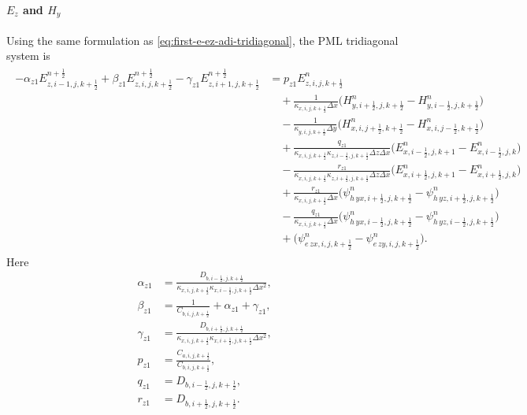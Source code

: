 \documentclass{article}
\numberwithin{equation}{section}
\numberwithin{figure}{section}
\begin{document}
\paragraph{$E_z$ and $H_y$}
Using the same formulation as \eqref{eq:first-e-ez-adi-tridiagonal}, the PML tridiagonal system is
\begin{align}
    \begin{split}
        -\alpha_{z1}E_{z,i-1,j,k+\tfrac12}^{n+\frac12} + \beta_{z1}E_{z,i,j,k+\tfrac12}^{n+\frac12} - \gamma_{z1}E_{z,i+1,j,k+\tfrac12}^{n+\frac12}
         & = p_{z1}E_{z,i,j,k+\tfrac12}^{n}                                                                                                                               \\
         & \quad +\frac{1}{\kappa_{x,i,j,k+\tfrac12}\Delta x}\Big(H_{y,i+\tfrac12,j,k+\tfrac12}^{n}-H_{y,i-\tfrac12,j,k+\tfrac12}^{n}\Big)                                \\
         & \quad -\frac{1}{\kappa_{y,i,j,k+\tfrac12}\Delta y}\Big(H_{x,i,j+\tfrac12,k+\tfrac12}^{n}-H_{x,i,j-\tfrac12,k+\tfrac12}^{n}\Big)                                \\
         & \quad +\frac{q_{z1}}{\kappa_{x,i,j,k+\tfrac12}\kappa_{z,i-\tfrac12,j,k+\tfrac12}\Delta z\Delta x}\Big(E_{x,i-\tfrac12,j,k+1}^{n}-E_{x,i-\tfrac12,j,k}^{n}\Big) \\
         & \quad -\frac{r_{z1}}{\kappa_{x,i,j,k+\tfrac12}\kappa_{z,i+\tfrac12,j,k+\tfrac12}\Delta z\Delta x}\Big(E_{x,i+\tfrac12,j,k+1}^{n}-E_{x,i+\tfrac12,j,k}^{n}\Big) \\
         & \quad +\frac{r_{z1}}{\kappa_{x,i,j,k+\tfrac12}\Delta x}\Big(\psi^{n}_{h\,yx,i+\tfrac12,j,k+\tfrac12} - \psi^{n}_{h\,yz,i+\tfrac12,j,k+\tfrac12}\Big)           \\
         & \quad -\frac{q_{z1}}{\kappa_{x,i,j,k+\tfrac12}\Delta x}\Big(\psi^{n}_{h\,yx,i-\tfrac12,j,k+\tfrac12} - \psi^{n}_{h\,yz,i-\tfrac12,j,k+\tfrac12}\Big)           \\
         & \quad +\Big(\psi^{n}_{e\,zx,i,j,k+\tfrac12}-\psi^{n}_{e\,zy,i,j,k+\tfrac12}\Big).
    \end{split}
    \label{eq:first-e-ez-pml-adi-tridiagonal}
\end{align}
Here
\begin{align}
    \alpha_{z1} & =\frac{D_{b,i-\tfrac12,j,k+\tfrac12}}{\kappa_{x,i,j,k+\tfrac12}\kappa_{x,i-\tfrac12,j,k+\tfrac12}\Delta x^2}, \\
    \beta_{z1}  & =\frac{1}{C_{b,i,j,k+\tfrac12}}+\alpha_{z1}+\gamma_{z1},                                                      \\
    \gamma_{z1} & =\frac{D_{b,i+\tfrac12,j,k+\tfrac12}}{\kappa_{x,i,j,k+\tfrac12}\kappa_{x,i+\tfrac12,j,k+\tfrac12}\Delta x^2}, \\
    p_{z1}      & =\frac{C_{a,i,j,k+\tfrac12}}{C_{b,i,j,k+\tfrac12}},                                                           \\
    q_{z1}      & =D_{b,i-\tfrac12,j,k+\tfrac12},                                                                               \\
    r_{z1}      & =D_{b,i+\tfrac12,j,k+\tfrac12}.
\end{align}
\end{document}
